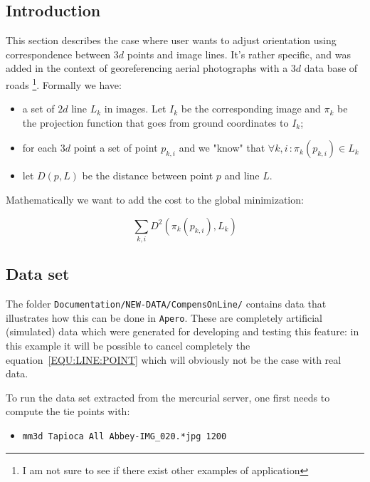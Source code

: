 \subsection{Introduction}

This section describes the case where user wants to adjust orientation using correspondence between $3d$ points
and image lines. It's rather specific, and was added in the context of georeferencing aerial photographs with a $3d$
data base of roads \footnote{I am not sure to see if there exist other examples of application}. Formally we have:

\begin{itemize}
    \item a set of $2d$ line $L_k$ in images. Let $I_k$ be the corresponding image and $\pi_k$ be the projection
         function that goes from ground coordinates to $I_k$;
    \item for each $3d$ point a set of point $p_{k,i}$ and we "know" that $\forall k,i \, : \pi_k (p_{k,i}) \in L_k $
    \item let $D(p,L)$ be the distance between point $p$ and line $L$.
\end{itemize}

Mathematically we want to add the cost to the global minimization:

\begin{equation}
    \sum_{k,i} D^2 ( \pi_k(p_{k,i}),L_k) \label{EQU:LINE:POINT}
\end{equation}



\subsection{Data set}

The folder {\tt Documentation/NEW-DATA/CompensOnLine/} contains  data that illustrates how this can be done in
{\tt Apero}. These are completely artificial (simulated) data which were generated for developing and testing this feature: in this example it will be possible to cancel completely the equation~\ref{EQU:LINE:POINT} which will obviously not
be the case with real data.

To run the data set extracted from the mercurial server, one first needs to compute the tie points with:

\begin{itemize}
   \item {\tt mm3d Tapioca All Abbey-IMG\_020.*jpg 1200}
\end{itemize}

